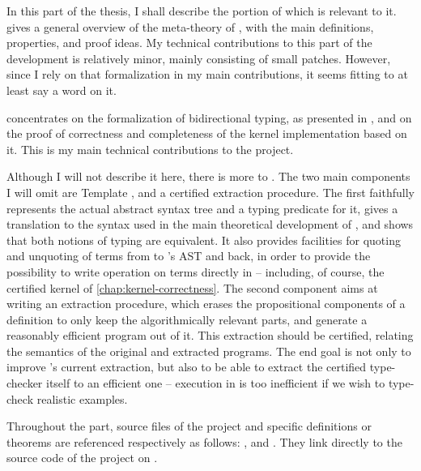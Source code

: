 In this part of the thesis,
I shall describe the portion of  which is relevant to it.
 gives a general overview of
the meta-theory of , with the main definitions, properties, and proof ideas.
My technical contributions to this part of the development is relatively minor,
mainly consisting of small patches. However, since I rely on that formalization
in my main contributions, it seems fitting to at least say a word on it.

 concentrates on the formalization of bidirectional typing, as
presented in , and on the proof of correctness and completeness of
the kernel implementation based on it. This is my main technical
contributions to the  project.

Although I will not describe it here, there is more to . The two main components
I will omit are Template , and a certified extraction procedure.
The first faithfully represents the actual  abstract
syntax tree and a typing predicate for it, gives a translation to the syntax used in
the main theoretical development of ,%
and shows that both notions of typing are equivalent.
It also provides facilities for quoting and unquoting of terms from
 to ’s AST and back, in order to provide the possibility to write operation
on  terms directly in  – including, of course, the certified kernel of
\cref{chap:kernel-correctness}.
The second component aims at writing an extraction procedure,
which erases the propositional components of a definition to only keep the algorithmically relevant
parts, and generate a reasonably efficient program out of it. This extraction should be certified,
relating the semantics of the original and extracted programs.
The end goal is not only to improve ’s current extraction, but also to be able to extract
the certified type-checker itself to an efficient one – execution in  is too inefficient
if we wish to type-check realistic examples.

Throughout the part, source files of the  project
and specific definitions or theorems are referenced respectively as follows:
, and . They link directly to the source
code of the project on .